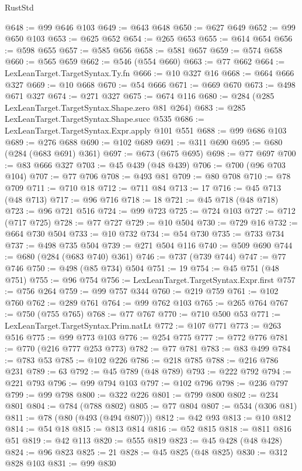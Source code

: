 \begin{lexlean}{RustStd}
\begin{coremodule}
@648 := @99 @646 @103
@649 := @643 @648
@650 := @627 @649
@652 := @99 @650 @103
@653 := @625 @652
@654 := @265 @653
@655 := @614 @654
@656 := @598 @655
@657 := @585 @656
@658 := @581 @657
@659 := @574 @658
@660 := @565 @659
@662 := @546 (@554 @660)
@663 := @77 @662
@664 := LexLeanTarget.TargetSyntax.Ty.fn
@666 := @10 @327 @16
@668 := @664 @666 @327
@669 := @10 @668
@670 := @54 @666
@671 := @669 @670
@673 := @498 @671 @327
@674 := @271 @327
@675 := @674 @116
@680 := @284 (@285 LexLeanTarget.TargetSyntax.Shape.zero @81 @264)
@683 := @285 LexLeanTarget.TargetSyntax.Shape.succ @535
@686 := LexLeanTarget.TargetSyntax.Expr.apply @101 @551
@688 := @99 @686 @103
@689 := @276 @688
@690 := @102 @689
@691 := @311 @690
@695 := @680 (@284 (@683 @691) @361)
@697 := @673 (@675 @695)
@698 := @77 @697
@700 := @83 @666 @327
@703 := @45 @439 (@48 @439)
@706 := @700 (@96 @703 @104)
@707 := @77 @706
@708 := @493 @81
@709 := @80 @708
@710 := @78 @709
@711 := @710 @18
@712 := @711 @84
@713 := 17
@716 := @45 @713 (@48 @713)
@717 := @96 @716
@718 := 18
@721 := @45 @718 (@48 @718)
@723 := @96 @721 @516
@724 := @99 @723
@725 := @724 @103
@727 := @712 (@717 @725)
@728 := @77 @727
@729 := @10 @504
@730 := @729 @16
@732 := @664 @730 @504
@733 := @10 @732
@734 := @54 @730
@735 := @733 @734
@737 := @498 @735 @504
@739 := @271 @504 @116
@740 := @509 @690
@744 := @680 (@284 (@683 @740) @361)
@746 := @737 (@739 @744)
@747 := @77 @746
@750 := @498 (@85 @734) @504
@751 := 19
@754 := @45 @751 (@48 @751)
@755 := @96 @754
@756 := LexLeanTarget.TargetSyntax.Expr.first
@757 := @756 @264
@759 := @99 @757 @344
@760 := @219 @759
@761 := @102 @760
@762 := @289 @761
@764 := @99 @762 @103
@765 := @265 @764
@767 := @750 (@755 @765)
@768 := @77 @767
@770 := @710 @500 @53
@771 := LexLeanTarget.TargetSyntax.Prim.natLt
@772 := @107 @771
@773 := @263 @516
@775 := @99 @773 @103
@776 := @254 @775
@777 := @772 @776
@781 := @770 (@216 @777 @253 @773)
@782 := @77 @781
@783 := @83 @499
@784 := @783 @53
@785 := @102 @226
@786 := @218 @785
@788 := @216 @786 @231
@789 := 63
@792 := @45 @789 (@48 @789)
@793 := @222 @792
@794 := @221 @793
@796 := @99 @794 @103
@797 := @102 @796
@798 := @236 @797
@799 := @99 @798
@800 := @322 @226
@801 := @799 @800
@802 := @234 @801
@804 := @784 (@788 @802)
@805 := @77 @804
@807 := @534 (@306 @81)
@811 := @78 (@80 (@493 (@494 @807)))
@812 := @42 @93
@813 := @10 @812
@814 := @54 @18
@815 := @813 @814
@816 := @52 @815
@818 := @811 @816 @51
@819 := @42 @113
@820 := @555 @819
@823 := @45 @428 (@48 @428)
@824 := @96 @823
@825 := 21
@828 := @45 @825 (@48 @825)
@830 := @312 @828 @103
@831 := @99 @830

\end{coremodule}
\end{lexlean}
